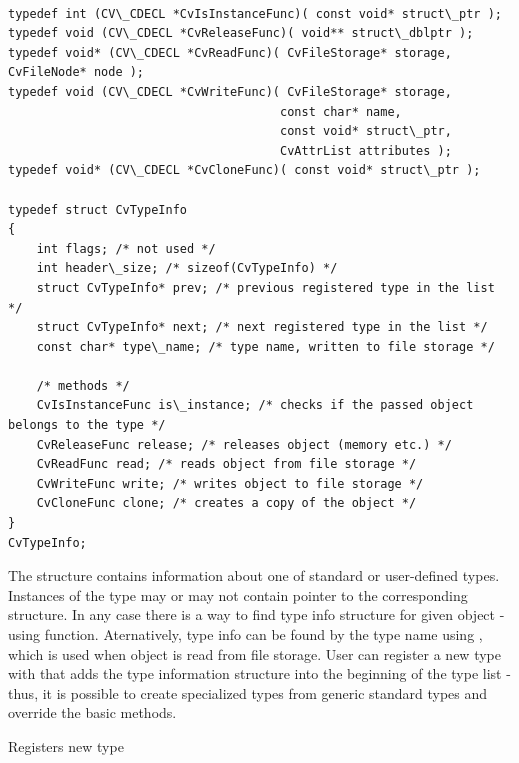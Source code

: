 \begin{lstlisting}

typedef int (CV\_CDECL *CvIsInstanceFunc)( const void* struct\_ptr );
typedef void (CV\_CDECL *CvReleaseFunc)( void** struct\_dblptr );
typedef void* (CV\_CDECL *CvReadFunc)( CvFileStorage* storage, CvFileNode* node );
typedef void (CV\_CDECL *CvWriteFunc)( CvFileStorage* storage,
                                      const char* name,
                                      const void* struct\_ptr,
                                      CvAttrList attributes );
typedef void* (CV\_CDECL *CvCloneFunc)( const void* struct\_ptr );

typedef struct CvTypeInfo
{
    int flags; /* not used */
    int header\_size; /* sizeof(CvTypeInfo) */
    struct CvTypeInfo* prev; /* previous registered type in the list */
    struct CvTypeInfo* next; /* next registered type in the list */
    const char* type\_name; /* type name, written to file storage */

    /* methods */
    CvIsInstanceFunc is\_instance; /* checks if the passed object belongs to the type */
    CvReleaseFunc release; /* releases object (memory etc.) */
    CvReadFunc read; /* reads object from file storage */
    CvWriteFunc write; /* writes object to file storage */
    CvCloneFunc clone; /* creates a copy of the object */
}
CvTypeInfo;

\end{lstlisting}

The structure  contains information about one of
standard or user-defined types. Instances of the type may or may not
contain pointer to the corresponding  structure. In
any case there is a way to find type info structure for given object -
using  function. Aternatively, type info can be found by
the type name using , which is used when object is read
from file storage. User can register a new type with 
that adds the type information structure into the beginning of the type
list - thus, it is possible to create specialized types from generic
standard types and override the basic methods.

\label{RegisterType}

Registers new type


\begin{description}
\end{description}


